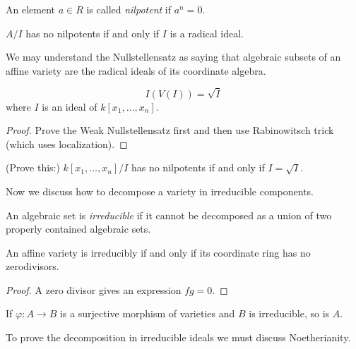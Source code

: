 \documentclass{book}
\begin{document}
\begin{definition}
\label{definition-nilpotent}
An element $a \in R$ is called {\it
nilpotent}
if $a^n = 0$.
\end{definition}

\begin{exercise}
\label{exercise-no-nilpotents-iff-radical}
$A/I$ has no nilpotents if and only if $I$ is
a radical ideal.
\end{exercise}

\noindent
We may understand the Nullstellensatz
as saying that algebraic subsets of an affine
variety
are the radical ideals of its coordinate
algebra.

\begin{theorem}[Nullstellensatz]
\label{theorem-nullstellensatz}
$$
I(V(I))=\sqrt{I}
$$
where $I$ is an ideal of $k[x_1,…,x_n]$.
\end{theorem}

\begin{proof}
Prove the Weak Nullstellensatz first
and then use Rabinowitsch trick
(which uses localization).
\end{proof}

\noindent
(Prove this:)
$k[x_1,…,x_n]/I$ has no nilpotents if and
only if
$I = \sqrt{I}$.

\medskip\noindent
Now we discuss how to decompose a variety in
irreducible components.

\begin{definition}
\label{definition-irreducible-variety}
An algebraic set is {\it irreducible}
if it cannot be decomposed as a union of two
properly
contained algebraic sets.
\end{definition}

\begin{lemma}
\label{lemma-irred-iff-coord-ring-reduc}
An affine variety is irreducibly if and only
if
its coordinate ring has no zerodivisors.
\end{lemma}

\begin{proof}
A zero divisor gives an expression $fg=0$.
\end{proof}

\begin{exercise}
\label{exercise-surje-map-irred-varie}
If $\varphi:A \to B$ is a surjective morphism
of varieties
and $B$ is irreducible, so is $A$.
\end{exercise}


To prove the decomposition in
irreducible ideals we must discuss
Noetherianity.
\end{document}
